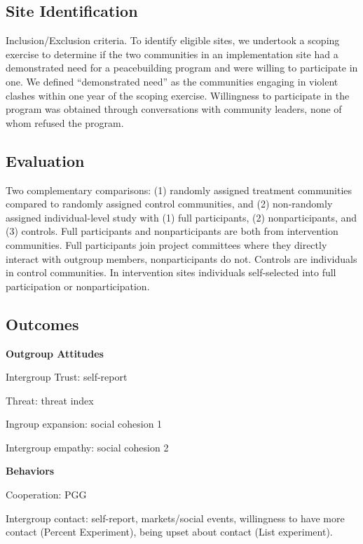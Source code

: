 \documentclass[11pt]{article}
\begin{document}
\hypertarget{site-identification}{%
\subsection{Site Identification}\label{site-identification}}

Inclusion/Exclusion criteria. To identify eligible sites, we undertook a
scoping exercise to determine if the two communities in an
implementation site had a demonstrated need for a peacebuilding program
and were willing to participate in one. We defined ``demonstrated need''
as the communities engaging in violent clashes within one year of the
scoping exercise. Willingness to participate in the program was obtained
through conversations with community leaders, none of whom refused the
program.

\hypertarget{evaluation}{%
\subsection{Evaluation}\label{evaluation}}

Two complementary comparisons: (1) randomly assigned treatment
communities compared to randomly assigned control communities, and (2)
non-randomly assigned individual-level study with (1) full participants,
(2) nonparticipants, and (3) controls. Full participants and
nonparticipants are both from intervention communities. Full
participants join project committees where they directly interact with
outgroup members, nonparticipants do not. Controls are individuals in
control communities. In intervention sites individuals self-selected
into full participation or nonparticipation.

\hypertarget{outcomes}{%
\subsection{Outcomes}\label{outcomes}}

\textbf{Outgroup Attitudes}

Intergroup Trust: self-report

Threat: threat index

Ingroup expansion: social cohesion 1

Intergroup empathy: social cohesion 2

\textbf{Behaviors}

Cooperation: PGG

Intergroup contact: self-report, markets/social events, willingness to
have more contact (Percent Experiment), being upset about contact (List
experiment).
\end{document}
